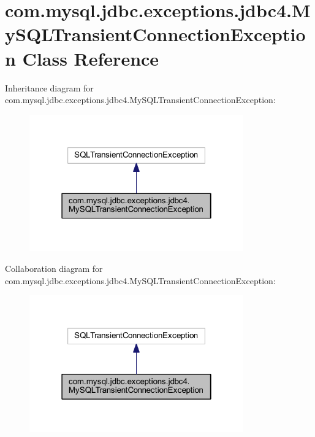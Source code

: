\hypertarget{classcom_1_1mysql_1_1jdbc_1_1exceptions_1_1jdbc4_1_1_my_s_q_l_transient_connection_exception}{}\section{com.\+mysql.\+jdbc.\+exceptions.\+jdbc4.\+My\+S\+Q\+L\+Transient\+Connection\+Exception Class Reference}
\label{classcom_1_1mysql_1_1jdbc_1_1exceptions_1_1jdbc4_1_1_my_s_q_l_transient_connection_exception}


Inheritance diagram for com.\+mysql.\+jdbc.\+exceptions.\+jdbc4.\+My\+S\+Q\+L\+Transient\+Connection\+Exception\+:
\nopagebreak
\begin{figure}[H]
\begin{center}
\leavevmode
\includegraphics[width=262pt]{classcom_1_1mysql_1_1jdbc_1_1exceptions_1_1jdbc4_1_1_my_s_q_l_transient_connection_exception__inherit__graph}
\end{center}
\end{figure}


Collaboration diagram for com.\+mysql.\+jdbc.\+exceptions.\+jdbc4.\+My\+S\+Q\+L\+Transient\+Connection\+Exception\+:
\nopagebreak
\begin{figure}[H]
\begin{center}
\leavevmode
\includegraphics[width=262pt]{classcom_1_1mysql_1_1jdbc_1_1exceptions_1_1jdbc4_1_1_my_s_q_l_transient_connection_exception__coll__graph}
\end{center}
\end{figure}
